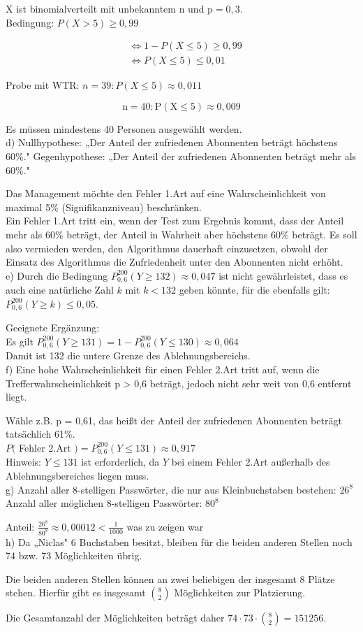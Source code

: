 \documentclass[10pt]{article}
\begin{document}
X ist binomialverteilt mit unbekanntem n und $\mathrm{p}=0,3$.\\
Bedingung: $P(X>5) \geq 0,99$

$$
\begin{aligned}
& \Leftrightarrow 1-P(X \leq 5) \geq 0,99 \\
& \Leftrightarrow P(X \leq 5) \leq 0,01
\end{aligned}
$$

Probe mit WTR: $n=39: P(X \leq 5) \approx 0,011$

$$
\mathrm{n}=40: \mathrm{P}(\mathrm{X} \leq 5) \approx 0,009
$$

Es müssen mindestens 40 Personen ausgewählt werden.\\
d) Nullhypothese: „Der Anteil der zufriedenen Abonnenten beträgt höchstens 60\%." Gegenhypothese: „Der Anteil der zufriedenen Abonnenten beträgt mehr als 60\%."

Das Management möchte den Fehler 1.Art auf eine Wahrscheinlichkeit von maximal 5\% (Signifikanzniveau) beschränken.\\
Ein Fehler 1.Art tritt ein, wenn der Test zum Ergebnis kommt, dass der Anteil mehr als 60\% beträgt, der Anteil in Wahrheit aber höchstens 60\% beträgt. Es soll also vermieden werden, den Algorithmus dauerhaft einzusetzen, obwohl der Einsatz des Algorithmus die Zufriedenheit unter den Abonnenten nicht erhöht.\\
e) Durch die Bedingung $P_{0,6}^{200}(Y \geq 132) \approx 0,047$ ist nicht gewährleistet, dass es auch eine natürliche Zahl $k$ mit $k<132$ geben könnte, für die ebenfalls gilt: $P_{0,6}^{200}(Y \geq k) \leq 0,05$.

Geeignete Ergänzung:\\
Es gilt $P_{0,6}^{200}(Y \geq 131)=1-P_{0,6}^{200}(Y \leq 130) \approx 0,064$\\
Damit ist 132 die untere Grenze des Ablehnungsbereichs.\\
f) Eine hohe Wahrscheinlichkeit für einen Fehler 2.Art tritt auf, wenn die Trefferwahrscheinlichkeit p > 0,6 beträgt, jedoch nicht sehr weit von 0,6 entfernt liegt.

Wähle z.B. p = 0,61, das heißt der Anteil der zufriedenen Abonnenten beträgt tatsächlich 61\%.\\
$P($ Fehler 2.Art $)=P_{0,6}^{200}(Y \leq 131) \approx 0,917$\\
Hinweis: $Y \leq 131$ ist erforderlich, da $Y$ bei einem Fehler 2.Art außerhalb des Ablehnungsbereiches liegen muss.\\
g) Anzahl aller 8-stelligen Passwörter, die nur aus Kleinbuchstaben bestehen: $26^{8}$ Anzahl aller möglichen 8-stelligen Passwörter: $80^{8}$

Anteil: $\frac{26^{8}}{80^{8}} \approx 0,00012<\frac{1}{1000}$ was zu zeigen war\\
h) Da „Niclas" 6 Buchstaben besitzt, bleiben für die beiden anderen Stellen noch 74 bzw. 73 Möglichkeiten übrig.

Die beiden anderen Stellen können an zwei beliebigen der insgesamt 8 Plätze stehen. Hierfür gibt es insgesamt $\binom{8}{2}$ Möglichkeiten zur Platzierung.

Die Gesamtanzahl der Möglichkeiten beträgt daher $74 \cdot 73 \cdot\binom{8}{2}=151256$.
\end{document}
